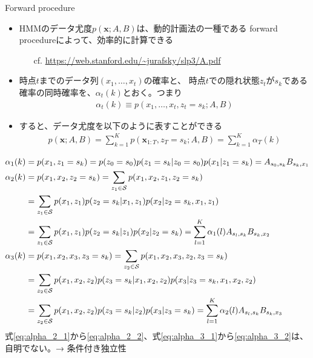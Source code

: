 \documentclass[aspectratio=169,unicode,dvipdfmx,14pt]{beamer}
\begin{document}
\begin{frame}{Forward procedure}
\begin{itemize}
\item HMMのデータ尤度$p(\bm{x}; A,B)$は、動的計画法の一種である
forward procedureによって、効率的に計算できる
\begin{itemize}
\item[cf.] \href{https://web.stanford.edu/~jurafsky/slp3/A.pdf}{https://web.stanford.edu/\~{}jurafsky/slp3/A.pdf}
\end{itemize}
\item 時点$t$までのデータ列$(x_1,\ldots,x_t)$の確率と、
時点$t$での隠れ状態$z_t$が$s_k$である確率の同時確率を、$\alpha_t(k)$とおく。つまり
\begin{align}
\alpha_t(k) \equiv p(x_1,\ldots, x_t, z_t=s_k; A, B)
\end{align}
\item すると、データ尤度を以下のように表すことができる
\begin{align}
p(\bm{x}; A,B) = \sum_{k=1}^K p(\bm{x}_{1:T}, z_T=s_k; A,B) = \sum_{k=1}^K \alpha_T(k)
\end{align}
\end{itemize}
\end{frame}

\begin{frame}{}
\FontMath
\vspace{-.25in}
\begin{align}
\alpha_1(k) & = p(x_1,z_1=s_k) = p(z_0=s_0)p(z_1=s_k|z_0=s_0)p(x_1|z_1=s_k) = A_{s_0,s_k} B_{s_k,x_1}
\label{eq:alpha_1} \\ 
\alpha_2(k) & = p(x_1, x_2, z_2=s_k) = \sum_{z_1 \in \mathcal{S}} p(x_1,x_2, z_1, z_2=s_k)
\notag \\ &
= \sum_{z_1 \in \mathcal{S}} p(x_1,z_1) p(z_2=s_k|x_1, z_1) p(x_2|z_2=s_k, x_1, z_1)
\label{eq:alpha_2_1} \\ &
= \sum_{z_1 \in \mathcal{S}} p(x_1,z_1) p(z_2=s_k|z_1) p(x_2|z_2=s_k)
= \sum_{l=1}^K \alpha_1(l) A_{s_l,s_k} B_{s_k,x_2}
\label{eq:alpha_2_2} \\
\alpha_3(k) & = p(x_1,x_2,x_3,z_3=s_k) = \sum_{z_2 \in \mathcal{S}} p(x_1,x_2, x_3, z_2, z_3=s_k)
\notag \\ &
= \sum_{z_2 \in \mathcal{S}} p(x_1,x_2, z_2) p(z_3=s_k|x_1,x_2,z_2) p(x_3|z_3=s_k,x_1,x_2,z_2)
\label{eq:alpha_3_1} \\ &
= \sum_{z_2 \in \mathcal{S}} p(x_1,x_2,z_2) p(z_3=s_k|z_2) p(x_3|z_3=s_k)
= \sum_{l=1}^K \alpha_2(l) A_{s_l,s_k} B_{s_k, x_3}
\label{eq:alpha_3_2} 
\end{align}
式\eqref{eq:alpha_2_1}から\eqref{eq:alpha_2_2}、式\eqref{eq:alpha_3_1}から\eqref{eq:alpha_3_2}は、自明でない。→ 条件付き独立性
\end{frame}
\end{document}

